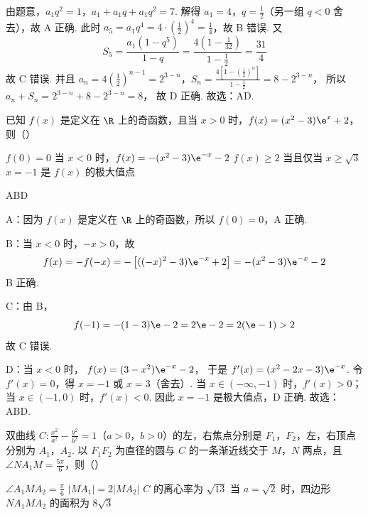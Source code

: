 \begin{solution}
由题意，\(a_1q^2=1\)，\(a_1+a_1q+a_1q^2=7\).
解得 \(a_1=4\)，\(q=\frac12\)（另一组 \(q<0\) 舍去），故 A 正确.
此时 \(a_5=a_1q^4=4\cdot\left(\frac12\right)^4=\frac14\)，故 B 错误.
又
\[
S_5=\frac{a_1(1-q^5)}{1-q}
=\frac{4\left(1-\frac{1}{32}\right)}{1-\frac12}
=\frac{31}{4}
\]
故 C 错误.
并且
\(a_n=4\left(\frac12\right)^{n-1}=2^{3-n}\)，\(S_n=\frac{4\left[1-\left(\frac12\right)^n\right]}{1-\frac12}=8-2^{3-n}\)，
所以
\(a_n+S_n=2^{3-n}+8-2^{3-n}=8\)，
故 D 正确. 故选：AD.
\end{solution}

\begin{problem}
已知 \(f(x)\) 是定义在 \(\R\) 上的奇函数，且当 \(x>0\) 时，\(f(x)=(x^2-3)\e^x+2\)，则（\quad）

\choices
    {\(f(0)=0\)}
    {当 \(x<0\) 时，\(f(x)=-(x^2-3)\e^{-x}-2\)}
    {\(f(x)\ge 2\) 当且仅当 \(x\ge \sqrt3\)}
    {\(x=-1\) 是 \(f(x)\) 的极大值点}
\end{problem}

\begin{answer}
ABD
\end{answer}

\begin{solution}
A：因为 \(f(x)\) 是定义在 \(\R\) 上的奇函数，所以 \(f(0)=0\)，A 正确.

B：当 \(x<0\) 时，\(-x>0\)，故
\[
f(x)=-f(-x)=-\left[((-x)^2-3)\e^{-x}+2\right]=-(x^2-3)\e^{-x}-2
\]
B 正确.

C：由 B，
\[
f(-1)=-(1-3)\e-2=2\e-2=2(\e-1)>2
\]
故 C 错误.

D：当 \(x<0\) 时，
\(f(x)=(3-x^2)\e^{-x}-2\)，
于是
\(f'(x)=(x^2-2x-3)\e^{-x}\).
令 \(f'(x)=0\)，得 \(x=-1\) 或 \(x=3\)（舍去）. 当 \(x\in(-\infty,-1)\) 时，\(f'(x)>0\)；当 \(x\in(-1,0)\) 时，\(f'(x)<0\). 因此 \(x=-1\) 是极大值点，D 正确. 故选：ABD.
\end{solution}

\begin{problem}
双曲线 \(C:\frac{x^2}{a^2}-\frac{y^2}{b^2}=1\)（\(a>0\)，\(b>0\)）的左，右焦点分别是 \(F_1\)，\(F_2\)，左，右顶点分别为 \(A_1\)，\(A_2\). 以 \(F_1F_2\) 为直径的圆与 \(C\) 的一条渐近线交于 \(M\)，\(N\) 两点，且 \(\angle NA_1M=\frac{5\pi}{6}\)，则（\quad）

\choices
    {\(\angle A_1MA_2=\frac{\pi}{6}\)}
    {\(|MA_1|=2|MA_2|\)}
    {\(C\) 的离心率为 \(\sqrt{13}\)}
    {当 \(a=\sqrt2\) 时，四边形 \(NA_1MA_2\) 的面积为 \(8\sqrt3\)}
\end{problem}

